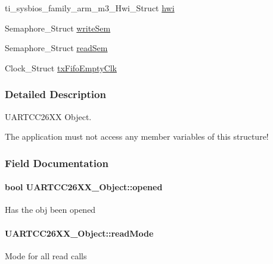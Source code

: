 \begin{DoxyCompactItemize}
\item 
ti\-\_\-sysbios\-\_\-family\-\_\-arm\-\_\-m3\-\_\-\-Hwi\-\_\-\-Struct \hyperlink{struct_u_a_r_t_c_c26_x_x___object_adfa38511dd1f8c470bb7f80afdfcd6eb}{hwi}
\item 
Semaphore\-\_\-\-Struct \hyperlink{struct_u_a_r_t_c_c26_x_x___object_a216c349e650909bd84072c076051117d}{write\-Sem}
\item 
Semaphore\-\_\-\-Struct \hyperlink{struct_u_a_r_t_c_c26_x_x___object_ab81ce13969ecc77d764000ea53fb23d2}{read\-Sem}
\item 
Clock\-\_\-\-Struct \hyperlink{struct_u_a_r_t_c_c26_x_x___object_a97be7390556f78f9361505c4ee860469}{tx\-Fifo\-Empty\-Clk}
\end{DoxyCompactItemize}


\subsubsection{Detailed Description}
U\-A\-R\-T\-C\-C26\-X\-X Object. 

The application must not access any member variables of this structure! 

\subsubsection{Field Documentation}
\paragraph[{opened}]{\setlength{\rightskip}{0pt plus 5cm}bool U\-A\-R\-T\-C\-C26\-X\-X\-\_\-\-Object\-::opened}\label{struct_u_a_r_t_c_c26_x_x___object_aabff5933f6661e2ebdbd8b001a6c12d7}
Has the obj been opened 
\paragraph[{read\-Mode}]{ U\-A\-R\-T\-C\-C26\-X\-X\-\_\-\-Object\-::read\-Mode}\label{struct_u_a_r_t_c_c26_x_x___object_a6f41cd73c5e6a1ea8ccc0a45bc588043}
Mode for all read calls 
